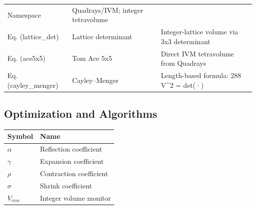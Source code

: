 \documentclass[
  10pt,
]{article}
\begin{document}
\begin{longtable}[]{@{}lll@{}}
\begin{minipage}[t]{0.30\columnwidth}
Namespace\strut
\end{minipage} & \begin{minipage}[t]{0.30\columnwidth}\raggedright
Quadrays/IVM; integer tetravolume\strut
\end{minipage}\tabularnewline
\begin{minipage}[t]{0.30\columnwidth}\raggedright
Eq. (lattice\_det)\strut
\end{minipage} & \begin{minipage}[t]{0.30\columnwidth}\raggedright
Lattice determinant\strut
\end{minipage} & \begin{minipage}[t]{0.30\columnwidth}\raggedright
Integer-lattice volume via 3x3 determinant\strut
\end{minipage}\tabularnewline
\begin{minipage}[t]{0.30\columnwidth}\raggedright
Eq. (ace5x5)\strut
\end{minipage} & \begin{minipage}[t]{0.30\columnwidth}\raggedright
Tom Ace 5x5\strut
\end{minipage} & \begin{minipage}[t]{0.30\columnwidth}\raggedright
Direct IVM tetravolume from Quadrays\strut
\end{minipage}\tabularnewline
\begin{minipage}[t]{0.30\columnwidth}\raggedright
Eq. (cayley\_menger)\strut
\end{minipage} & \begin{minipage}[t]{0.30\columnwidth}\raggedright
Cayley--Menger\strut
\end{minipage} & \begin{minipage}[t]{0.30\columnwidth}\raggedright
Length-based formula: 288 V\^{}2 = det(·)\strut
\end{minipage}\tabularnewline
\bottomrule
\end{longtable}

\hypertarget{optimization-and-algorithms}{%
\subsection{Optimization and
Algorithms}\label{optimization-and-algorithms}}

\begin{longtable}[]{@{}ll@{}}
\toprule
Symbol & Name\tabularnewline
\midrule
\endhead
\(\alpha\) & Reflection coefficient\tabularnewline
\(\gamma\) & Expansion coefficient\tabularnewline
\(\rho\) & Contraction coefficient\tabularnewline
\(\sigma\) & Shrink coefficient\tabularnewline
\(V_{ivm}\) & Integer volume monitor\tabularnewline
\bottomrule
\end{longtable}
\end{document}

